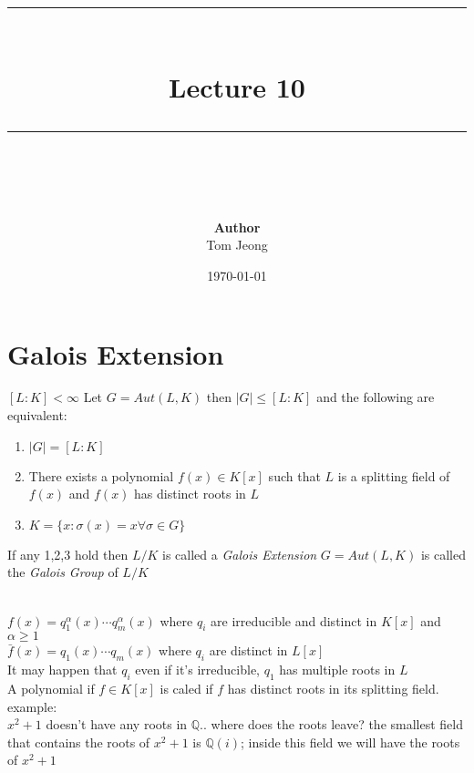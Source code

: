 \documentclass{article}
\newcommand{\HRule}[1]{\rule{\linewidth}{#1}}
\begin{document}
\title{
    \normalsize
    \vspace{2.0cm}
    \HRule{1.5pt} \\[0.4cm]
    \LARGE \textbf{Lecture 10}
    \HRule{2.0pt} \\[0.6cm]
}
\author{
    \textbf{Author} \\
    Tom Jeong
}
\date{\today}

\maketitle
\tableofcontents
\newpage

\section{Galois Extension}
\begin{theorem}
    

$[L: K] < \infty$ Let $G = Aut(L, K)$ then $|G| \leq [L: K]$ and the following are equivalent:\begin{enumerate}
    \item $|G| = [L: K]$
    \item There exists a polynomial $f(x) \in K[x]$ such that $L$ is a splitting field of $f(x)$ and $f(x)$ has distinct roots in $L$ 
    \item $K = \{x : \sigma(x) = x \forall \sigma \in G\}$
    
\end{enumerate}
If any 1,2,3 hold then $L/K$ is called a \textit{Galois Extension} $G= Aut(L, K)$ is called the \textit{Galois Group} of $L/K$
\end{theorem}
\hrulefill \\
$f(x) = q_1^\alpha(x) \cdots q_m^\alpha(x)$ where $q_i$ are irreducible and distinct in $K[x]$ and $\alpha \geq 1$ \\
    $\bar{f}(x) = q_1(x) \cdots q_m(x)$ where $q_i$ are distinct in $L[x]$ \\
    It may happen that $q_i$ even if it's irreducible, $q_1$ has multiple roots in $L$\\
    A polynomial if $f \in K[x]$ is caled  if $f$ has distinct roots in its splitting field. \\
    example: \\  
    $x^2 + 1$ doesn't have any roots in $\mathbb{Q}$.. where does the roots leave? the smallest field that contains the roots of $x^2 + 1$ is $\mathbb{Q}(i)$; inside this field we will have the roots of $x^2 + 1$ \\ \\ 
\end{document}
